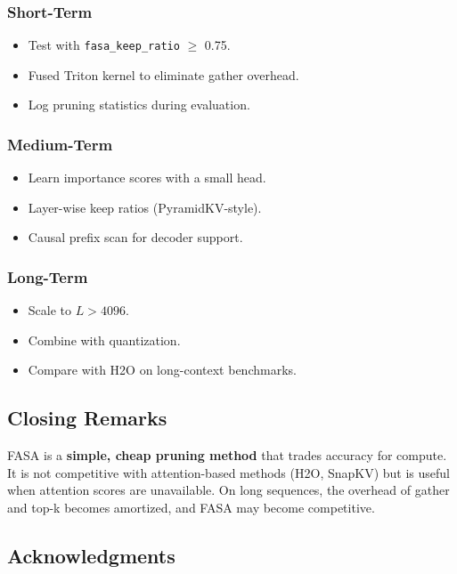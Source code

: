\subsubsection{Short-Term}

\begin{itemize}
\item Test with \texttt{fasa\_keep\_ratio} $\ge$ 0.75.
\item Fused Triton kernel to eliminate gather overhead.
\item Log pruning statistics during evaluation.

\end{itemize}
\subsubsection{Medium-Term}

\begin{itemize}
\item Learn importance scores with a small head.
\item Layer-wise keep ratios (PyramidKV-style).
\item Causal prefix scan for decoder support.

\end{itemize}
\subsubsection{Long-Term}

\begin{itemize}
\item Scale to $L > 4096$.
\item Combine with quantization.
\item Compare with H2O on long-context benchmarks.

\end{itemize}
\subsection{Closing Remarks}

FASA is a \textbf{simple, cheap pruning method} that trades accuracy for 
compute. It is not competitive with attention-based methods (H2O, SnapKV) 
but is useful when attention scores are unavailable. On long sequences, 
the overhead of gather and top-k becomes amortized, and FASA may become 
competitive.

\subsection{Acknowledgments}

